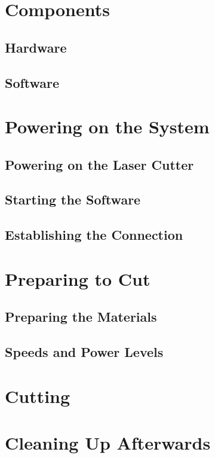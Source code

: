 \documentclass[letterpaper]{latexclasses/tinkermill}
\begin{document}
\maketitle

\newpage
\tableofcontents

\newpage

\section{Components}

\subsection{Hardware}

\subsection{Software}

\section{Powering on the System}

\subsection{Powering on the Laser Cutter}

\subsection{Starting the Software}

\subsection{Establishing the Connection}

\section{Preparing to Cut}

\subsection{Preparing the Materials}

\subsection{Speeds and Power Levels}

\section{Cutting}

\section{Cleaning Up Afterwards}
\end{document}
